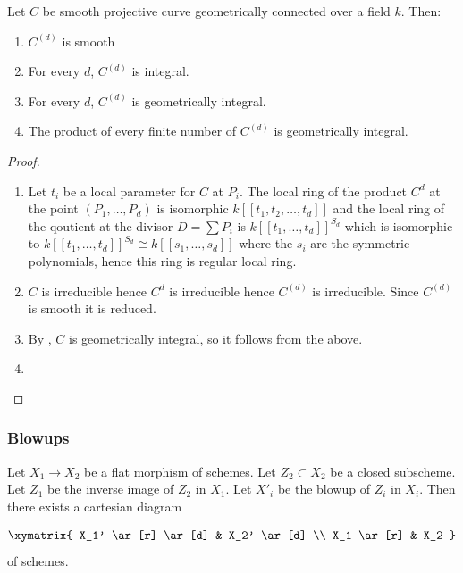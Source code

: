 \begin{theorem}
    Let $C$ be smooth projective curve geometrically connected over a field $k$. Then:
    \begin{enumerate}
        \item $C^{(d)}$ is smooth
        \item For every $d$, $C^{(d)}$ is integral.
        \item For every $d$, $C^{(d)}$ is geometrically integral.
        \item The product of every finite number of $C^{(d)}$ is geometrically integral. 
    \end{enumerate}
    \begin{proof}
        \begin{enumerate}
            \item Let $t_i$ be a local parameter for $C$ at $P_i$. The local ring of the product $C^d$ at the point $(P_1, \dots, P_d)$ is isomorphic $k[[t_1, t_2, \dots, t_d]]$
            and the local ring of the qoutient at the divisor $D=\sum P_i$ is $k[[t_1, \dots, t_d]]^{S_d}$ which is 
            isomorphic to $k[[t_1, \dots, t_d]]^{S_d} \cong k[[s_1, \dots, s_d]]$ where the $s_i$ are the 
            symmetric polynomials, hence this ring is regular local ring. 
            \item $C$ is irreducible hence $C^{d}$ is irreducible hence $C^{(d)}$ is irreducible. Since $C^{(d)}$ 
            is smooth it is reduced.
            \item By , $C$ is geometrically integral, so it follows from the above. 
            \item {}
        \end{enumerate}
    \end{proof}
\end{theorem}


\subsubsection*{Blowups}

\begin{theorem}[\stackstag{0805}]
Let $X_1 \to X_2$ be a flat morphism of schemes. Let $Z_2 \subset X_2$ be a closed subscheme. Let $Z_1$ be the inverse image of $Z_2$ in $X_1$. Let $X'_ i$ be the blowup of $Z_ i$ in $X_ i$. Then there exists a cartesian diagram

\[ \xymatrix{ X_1' \ar[r] \ar[d] & X_2' \ar[d] \\ X_1 \ar[r] & X_2 } \]
of schemes.   
\end{theorem}

